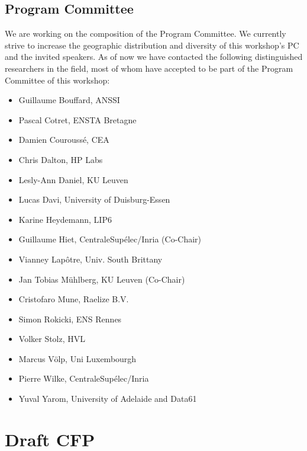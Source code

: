 \documentclass[a4paper,11pt]{article} %
\numberwithin{equation}{section} %
\numberwithin{figure}{section} %
\numberwithin{table}{section} %
\begin{document}
\subsection{Program Committee}

We are working on the composition of the Program Committee. We currently
strive to increase the geographic distribution and diversity of this
workshop's PC and the invited speakers. As of now we have contacted the
following distinguished researchers in the field, most of whom have
accepted to be part of the Program Committee of this workshop:


\begin{itemize}
    \item Guillaume Bouffard, ANSSI
    \item Pascal Cotret, ENSTA Bretagne
    \item Damien Couroussé, CEA
    \item Chris Dalton, HP Labs
    \item{Lesly-Ann Daniel, KU Leuven}
    \item Lucas Davi, University of Duisburg-Essen
    \item Karine Heydemann, LIP6
    \item Guillaume Hiet, CentraleSupélec/Inria (Co-Chair)
    \item Vianney Lapôtre, Univ. South Brittany
    \item Jan Tobias Mühlberg, KU Leuven (Co-Chair)
    \item Cristofaro Mune, Raelize B.V.
    \item Simon Rokicki, ENS Rennes
    \item Volker Stolz, HVL
    \item{Marcus V\"olp, Uni Luxembourgh}
    \item Pierre Wilke, CentraleSupélec/Inria
    \item Yuval Yarom, University of Adelaide and Data61
\end{itemize}


\section{Draft CFP}


\end{document}
